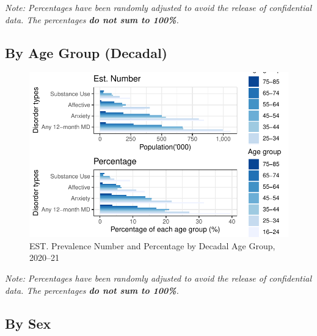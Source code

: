 \documentclass[
  a4paper,
  DIV=11,
  numbers=noendperiod]{scrreport}
\begin{document}
\emph{Note: Percentages have been randomly adjusted to avoid the release
of confidential data. The percentages \textbf{do not sum to 100\%}.}

\hypertarget{by-age-group-decadal}{%
\subsection{By Age Group (Decadal)}\label{by-age-group-decadal}}

\begin{figure}

\caption{\label{fig-12ad}EST. Prevalence Number and Percentage by
Decadal Age Group, 2020--21}

{\centering \includegraphics{./chap1-prevalence-of-md_files/figure-pdf/fig-12ad-1.pdf}

}

\end{figure}

\emph{Note: Percentages have been randomly adjusted to avoid the release
of confidential data. The percentages \textbf{do not sum to 100\%}.}

\hypertarget{by-sex-2}{%
\subsection{By Sex}\label{by-sex-2}}
\end{document}
